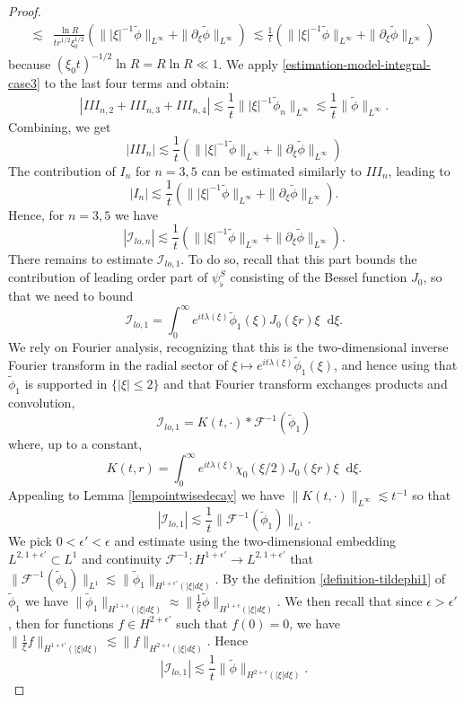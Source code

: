 \documentclass[11 pt]{amsart}
\theoremstyle{definition}
\theoremstyle{remark}
\numberwithin{equation}{section}
\newcommand{\dd}{\mathop{}\!\mathrm{d}}
\begin{document}
\begin{proof}
\begin{align*}
\lesssim & \frac{ \ln R}{tr^{1/2}\xi_0^{1/2}}(\||\xi|^{-1}\tilde \phi\|_{L^\infty}+\|\partial_\xi \tilde \phi\|_{L^\infty}) \ \lesssim \frac{1}{t}(\||\xi|^{-1}\tilde \phi\|_{L^\infty}+\|\partial_\xi \tilde \phi\|_{L^\infty})
\end{align*}
because $(\xi_0 t)^{-1/2}\ln R= R\ln R\ll 1$. We apply \eqref{estimation-model-integral-case3} to the last four terms and obtain:
$$
|III_{n,2} + III_{n,3}+III_{n,4}|\lesssim \frac{1}{t}\| |\xi|^{-1}\tilde \phi_n\|_{L^\infty}\lesssim \frac{1}{t}\| \tilde \phi\|_{L^\infty}.
$$
Combining, we get 
$$
|III_n|\lesssim \frac{1}{t}(\||\xi|^{-1}\tilde \phi\|_{L^\infty}+\|\partial_\xi \tilde \phi\|_{L^\infty})
$$
The contribution of $I_n$ for $n=3,5$ can be estimated similarly to $III_n$, leading to
$$
|I_n|\lesssim \frac{1}{t}(\||\xi|^{-1}\tilde \phi\|_{L^\infty}+\|\partial_\xi \tilde \phi\|_{L^\infty}).
$$
Hence, for $n=3,5$ we have
$$
|\mathcal{I}_{lo,n} | \lesssim  \frac{1}{t}(\||\xi|^{-1}\tilde \phi\|_{L^\infty}+\|\partial_\xi \tilde \phi\|_{L^\infty}).
$$
There remains to estimate $\mathcal{I}_{lo,1}$. To do so, recall that this part bounds the contribution of leading order part of $\psi^S_\flat$ consisting of the Bessel function $J_0$, so that we need to bound
$$
\mathcal{I}_{lo,1}= \int_{0}^\infty e^{it \lambda(\xi)}   \widetilde{\phi}_1 (\xi) J_0(\xi r)\xi \dd \xi .
$$
We rely on Fourier analysis, recognizing that this is the two-dimensional inverse Fourier transform in the radial sector of $\xi \mapsto e^{it \lambda(\xi)}   \widetilde{\phi}_1 (\xi)$, and hence using that $\widetilde{\phi}_1$ is supported in $\{|\xi|\leq 2\}$ and that Fourier transform exchanges products and convolution,
$$
\mathcal{I}_{lo,1}= K(t,\cdot)* \mathcal F^{-1}( \widetilde{\phi}_1)
$$
where, up to a constant,
$$
K(t,r)=  \int_{0}^\infty e^{it \lambda(\xi)} \chi_0(\xi/2) J_0(\xi r)\xi \dd \xi  .
$$
Appealing to Lemma \ref{lempointwisedecay} we have $\| K(t,\cdot)\|_{L^\infty}\lesssim t^{-1}$ so that
$$
|\mathcal{I}_{lo,1}|\lesssim \frac{1}{t} \| \mathcal F^{-1}( \widetilde{\phi}_1)\|_{L^1}.
$$
We pick $0<\epsilon'<\epsilon$ and estimate using the two-dimensional embedding $L^{2,1+\epsilon'}\subset L^1$ and continuity $\mathcal F^{-1}:H^{1+\epsilon'}\rightarrow L^{2,1+\epsilon'}$ that $\| \mathcal F^{-1}( \widetilde{\phi}_1)\|_{L^1}\lesssim \|  \widetilde{\phi}_1 \|_{H^{1+\epsilon'}(|\xi|d\xi)}$. By the definition \eqref{definition-tildephi1} of $\widetilde{\phi}_1$ we have $\|  \widetilde{\phi}_1 \|_{H^{1+\epsilon}(|\xi|d\xi)}\approx \| \frac{1}{\xi} \widetilde{\phi} \|_{H^{1+\epsilon}(|\xi|d\xi)}$. We then recall that since $\epsilon>\epsilon'$, then for functions $f\in H^{2+\epsilon'}$ such that $f(0)=0$, we have $\| \frac{1}{\xi} f \|_{H^{1+\epsilon'}(|\xi|d\xi)}\lesssim \| f \|_{H^{2+\epsilon}(|\xi|d\xi)}$. Hence
$$
|\mathcal{I}_{lo,1}|\lesssim \frac{1}{t} \| \widetilde{\phi} \|_{H^{2+\epsilon}(|\xi |d\xi)}.
$$


\end{proof}
\end{document}
